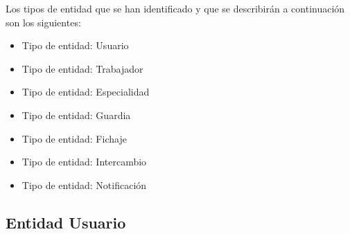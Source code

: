 Los tipos de entidad que se han identificado y que se describirán a continuación son los siguientes:
\begin{itemize}
    \item Tipo de entidad: Usuario
    \item Tipo de entidad: Trabajador
    \item Tipo de entidad: Especialidad
    \item Tipo de entidad: Guardia
    \item Tipo de entidad: Fichaje
    \item Tipo de entidad: Intercambio
    \item Tipo de entidad: Notificación
\end{itemize}

\subsection{Entidad Usuario}
